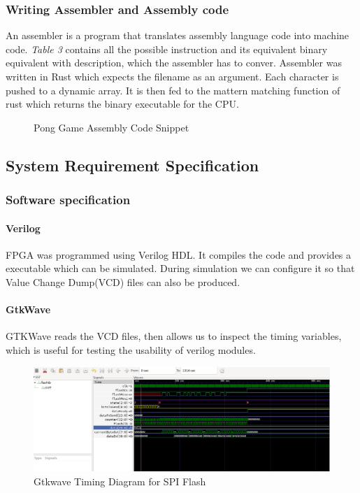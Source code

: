 \documentclass[a4paper,12pt]{article}
\begin{document}
    \subsubsection{Writing Assembler and Assembly code}

    An assembler is a program that translates assembly language code into machine code. \textit{Table 3} contains all the possible instruction and its equivalent binary equivalent with description, which the assembler has to conver. Assembler was written in Rust which expects the filename as an argument. Each character is pushed to a dynamic array. It is then fed to the mattern matching function of rust which returns the binary executable for the CPU.

    \begin{figure}[H]
    \centering
    
    \caption{Pong Game Assembly Code Snippet}
    \end{figure}

    \newpage
    \subsection{System Requirement Specification}
    \subsubsection{Software specification}
    \paragraph{Verilog} 
    FPGA was programmed using Verilog HDL. It compiles the code and provides a executable which can be simulated. During simulation we can configure it so that Value Change Dump(VCD) files can also be produced.
    \paragraph{GtkWave}
    GTKWave reads the VCD files, then allows us to inspect the timing variables, which is useful for testing the usability of verilog modules.
     \begin{figure}[H]
        \centering
        \includegraphics[width=1\textwidth ]{./images/gtkwave.png}
        \caption{Gtkwave Timing Diagram for SPI Flash}
    \end{figure}
\end{document}

